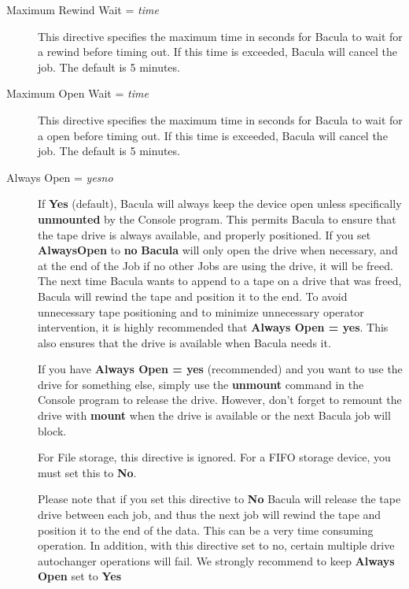 \begin{description}
\item [Maximum Rewind Wait = {\it time}]
   This directive specifies the maximum time in seconds for Bacula to wait
   for a rewind before timing out.  If this time is exceeded,
   Bacula will cancel the job.  The default is 5 minutes.

\item [Maximum Open Wait = {\it time}]
   This directive specifies the maximum time in seconds for Bacula to wait
   for a open before timing out.  If this time is exceeded,
   Bacula will cancel the job.  The default is 5 minutes.

\item [Always Open = {\it yes\vb{}no}]
   If {\bf Yes} (default), Bacula will always keep the device open unless
   specifically {\bf unmounted} by the Console program.  This permits
   Bacula to ensure that the tape drive is always available, and properly
   positioned. If you set
   {\bf AlwaysOpen} to {\bf no} {\bf Bacula} will only open the drive when
   necessary, and at the end of the Job if no other Jobs are using the
   drive, it will be freed.  The next time Bacula wants to append to a tape
   on a drive that was freed, Bacula will rewind the tape and position it to
   the end.  To avoid unnecessary tape positioning and to minimize
   unnecessary operator intervention, it is highly recommended that {\bf
   Always Open = yes}.  This also ensures that the drive is available when
   Bacula needs it.
   
   If you have {\bf Always Open = yes} (recommended) and you want to use the
   drive for something else, simply use the {\bf unmount} command in the
   Console program to release the drive. However, don't forget to remount the
   drive with {\bf mount} when the drive is available or the next Bacula job
   will block.
   
   For File storage, this directive is ignored. For a FIFO storage  device, you
   must set this to {\bf No}.  
   
   Please note that if you set this directive to {\bf No} Bacula  will release
   the tape drive between each job, and thus the next job  will rewind the tape
   and position it to the end of the data. This  can be a very time consuming
   operation. In addition, with this directive set to no, certain multiple
   drive autochanger operations will fail.  We strongly recommend to keep
   {\bf Always Open} set to {\bf Yes}


\end{description}
